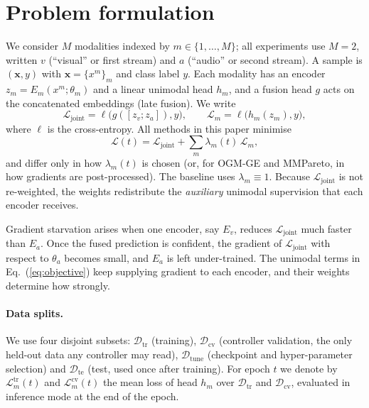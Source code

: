\documentclass[fleqn,10pt]{wlscirep}
\newcommand{\Ltr}{\mathcal{L}^{\mathrm{tr}}}
\newcommand{\Lcv}{\mathcal{L}^{\mathrm{cv}}}
\begin{document}
\section*{Problem formulation}
We consider $M$ modalities indexed by $m\in\{1,\dots,M\}$; all experiments use $M{=}2$, written $v$ (``visual'' or first stream) and $a$ (``audio'' or second stream). A sample is $(\mathbf{x},y)$ with $\mathbf{x}=\{x^m\}_m$ and class label $y$. Each modality has an encoder $z_m=E_m(x^m;\theta_m)$ and a linear unimodal head $h_m$, and a fusion head $g$ acts on the concatenated embeddings (late fusion). We write
\begin{equation}
\mathcal{L}_{\mathrm{joint}} = \ell\big(g([z_v;z_a]),y\big), \qquad \mathcal{L}_m=\ell\big(h_m(z_m),y\big),
\end{equation}
where $\ell$ is the cross-entropy. All methods in this paper minimise
\begin{equation}
\mathcal{L}(t)=\mathcal{L}_{\mathrm{joint}}+\sum_{m}\lambda_m(t)\,\mathcal{L}_m ,
\label{eq:objective}
\end{equation}
and differ only in how $\lambda_m(t)$ is chosen (or, for OGM-GE and MMPareto, in how gradients are post-processed). The baseline uses $\lambda_m\equiv1$. Because $\mathcal{L}_{\mathrm{joint}}$ is not re-weighted, the weights redistribute the \emph{auxiliary} unimodal supervision that each encoder receives.

Gradient starvation arises when one encoder, say $E_v$, reduces $\mathcal{L}_{\mathrm{joint}}$ much faster than $E_a$. Once the fused prediction is confident, the gradient of $\mathcal{L}_{\mathrm{joint}}$ with respect to $\theta_a$ becomes small, and $E_a$ is left under-trained\cite{pezeshki2021gradient,huang2022modality}. The unimodal terms in Eq.~(\ref{eq:objective}) keep supplying gradient to each encoder, and their weights determine how strongly.

\paragraph{Data splits.} We use four disjoint subsets: $\mathcal{D}_{\mathrm{tr}}$ (training), $\mathcal{D}_{\mathrm{cv}}$ (controller validation, the only held-out data any controller may read), $\mathcal{D}_{\mathrm{tune}}$ (checkpoint and hyper-parameter selection) and $\mathcal{D}_{\mathrm{te}}$ (test, used once after training). For epoch $t$ we denote by $\Ltr_m(t)$ and $\Lcv_m(t)$ the mean loss of head $h_m$ over $\mathcal{D}_{\mathrm{tr}}$ and $\mathcal{D}_{\mathrm{cv}}$, evaluated in inference mode at the end of the epoch.
\end{document}
